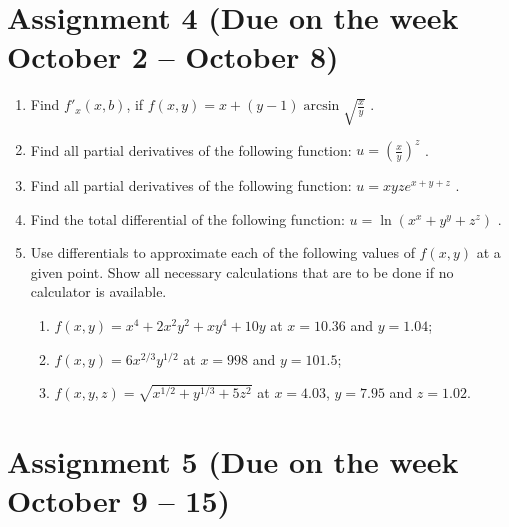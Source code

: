 \documentclass[12pt]{article} %
\theoremstyle{definition} %
\begin{document}
\section*{Assignment 4 (Due on the week October 2 – October 8)}

\begin{enumerate}

\item Find $f'_x(x,b)$, if $f(x,y)= x+(y-1)\arcsin \sqrt{\frac xy}$ .

\item Find all partial derivatives of the following function: $u=\left(\frac xy\right)^z$ .

\item Find all partial derivatives of the following function: $u=xyz e^{x+y+z}$ .

\item Find the total differential of the following function: $u=\ln (x^x+y^y+z^z)$ .

\item Use differentials to approximate each of the following values of $f(x,y)$ at a given point. Show all necessary calculations that are to be done if no calculator is available.
\begin{enumerate}
\item $f(x,y)=x^4+2x^2y^2+xy^4+10y$ at $x=10.36$ and $y=1.04$;
\item $f(x,y)=6x^{2/3}y^{1/2}$  at $x=998$ and $y=101.5$;
\item $f(x,y,z)=\sqrt{x^{1/2}+y^{1/3}+5z^2}$ at $x=4.03$, $y=7.95$ and $z=1.02$.
\end{enumerate}
\end{enumerate}



\section*{Assignment 5 (Due on the week October 9 – 15)}
\end{document}
